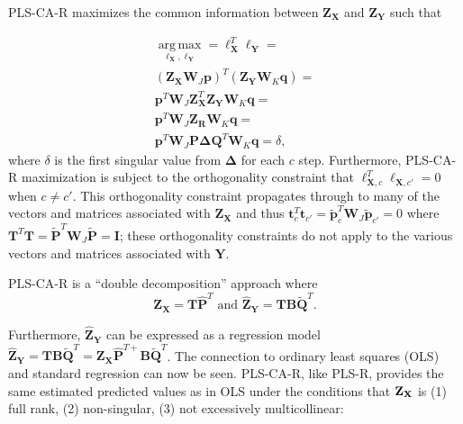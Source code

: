 \documentclass[12pt]{article}
\begin{document}
PLS-CA-R maximizes the common information between
\({\mathbf Z}_{\mathbf X}\) and \({\mathbf Z}_{\mathbf Y}\) such that

\begin{equation}
\begin{aligned}
\underset{{\boldsymbol \ell}_{\mathbf X},{\boldsymbol \ell}_{\mathbf Y}}{\operatorname{arg\,max}} = {\boldsymbol \ell}_{\mathbf X}^{T}{\boldsymbol \ell}_{\mathbf Y} = \\
({\mathbf Z}_{\mathbf X}{\mathbf W}_{J}{\mathbf p})^{T}({\mathbf Z}_{\mathbf Y}{\mathbf W}_{K}{\mathbf q}) = \\
{\mathbf p}^{T}{\mathbf W}_{J}{\mathbf Z}_{\mathbf X}^{T}{\mathbf Z}_{\mathbf Y}{\mathbf W}_{K}{\mathbf q} = \\
{\mathbf p}^{T}{\mathbf W}_{J}{\mathbf Z}_{{\mathbf R}}{\mathbf W}_{K}{\mathbf q} = \\
{\mathbf p}^{T}{\mathbf W}_{J}{\mathbf P}{\mathbf \Delta}{\mathbf Q}^{T}{\mathbf W}_{K}{\mathbf q} = \delta,
\end{aligned}
\end{equation} where \(\delta\) is the first singular value from
\({\mathbf \Delta}\) for each \(c\) step. Furthermore, PLS-CA-R
maximization is subject to the orthogonality constraint that
\({\boldsymbol \ell}_{{\mathbf X},c}^{T}{\boldsymbol \ell}_{{\mathbf X},c'} = 0\)
when \(c \neq c'\). This orthogonality constraint propagates through to
many of the vectors and matrices associated with
\({\mathbf Z}_{\mathbf X}\) and thus
\({\mathbf t}_{c}^{T}{\mathbf t}_{c'} = \widetilde{\mathbf p}_{c}^{T}{\mathbf W}_{J}\widetilde{\mathbf p}_{c'} = 0\)
where
\({\mathbf T}^{T}{\mathbf T} = \widetilde{\mathbf P}^{T}{\mathbf W}_{J}\widetilde{\mathbf P} = {\mathbf I}\);
these orthogonality constraints do not apply to the various vectors and
matrices associated with \({\mathbf Y}\).

PLS-CA-R is a ``double decomposition'' approach where \begin{equation}
{\mathbf Z}_{\mathbf X} = {\mathbf T}\widehat{\mathbf P}^{T} \text{ and } \widehat{{\mathbf Z}}_{\mathbf Y} = {\mathbf T}{\mathbf B}\widetilde{\mathbf Q}^{T}.
\label{eq:doubledecomp}
\end{equation}

Furthermore, \(\widehat{{\mathbf Z}}_{\mathbf Y}\) can be expressed as a
regression model
\(\widehat{{\mathbf Z}}_{\mathbf Y} = {\mathbf T} {\mathbf B}\widetilde{\mathbf Q}^{T} = {\mathbf Z}_{\mathbf X}\widehat{\mathbf P}^{{T}{+}}{\mathbf B}\widetilde{\mathbf Q}^{T}\).
The connection to ordinary least squares (OLS) and standard regression
can now be seen. PLS-CA-R, like PLS-R, provides the same estimated
predicted values as in OLS under the conditions that \({\bf Z}_{\bf X}\)
is (1) full rank, (2) non-singular, (3) not excessively multicollinear:
\end{document}
